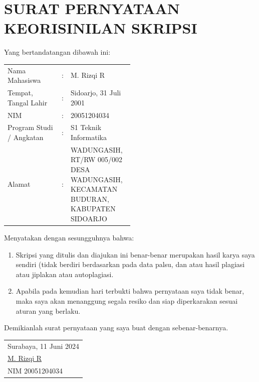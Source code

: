 \documentclass[10pt,twoside]{report}
\begin{document}
\chapter*{SURAT PERNYATAAN KEORISINILAN SKRIPSI}
\begin{adjustwidth}{0pt}{}

	Yang bertandatangan dibawah ini:\\

	\noindent
	\begin{tabular}{@{}lcp{0.5\linewidth}}
		Nama Mahasiswa           & : & M. Rizqi R                                                                                    \\
		Tempat, Tangal Lahir     & : & Sidoarjo, 31 Juli 2001                                                                        \\
		NIM                      & : & 20051204034                                                                                   \\
		Program Studi / Angkatan & : & S1 Teknik Informatika                                                                         \\
		Alamat                   & : & \raggedright WADUNGASIH, RT/RW 005/002 DESA WADUNGASIH, KECAMATAN BUDURAN, KABUPATEN SIDOARJO \\
	\end{tabular}

	\noindent
	Menyatakan dengan sesungguhnya bahwa:
	\begin{enumerate}
		\item Skripsi yang ditulis dan diajukan ini benar-benar merupakan hasil
		      karya saya sendiri (tidak berdiri berdasarkan pada data palsu, dan atau
		      hasil plagiasi atau jiplakan atau autoplagiasi.
		\item Apabila pada kemudian hari terbukti bahwa pernyataan saya tidak
		      benar, maka saya akan menanggung segala resiko dan siap diperkarakan
		      sesuai aturan yang berlaku.
	\end{enumerate}

	\noindent
	Demikianlah surat pernyataan yang saya buat dengan sebenar-benarnya.

	\vspace{0.5cm}

	\begin{adjustwidth}{170pt}{}
		\begin{tabular}{@{}l}
			Surabaya, 11 Juni 2024
			\vspace{2.5cm}
			\\
			\underline{M. Rizqi R} \\
			NIM 20051204034        \\
		\end{tabular}
	\end{adjustwidth}
\end{adjustwidth}
\end{document}
